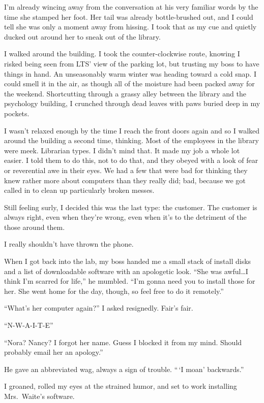 I'm already wincing away from the conversation at his very familiar words by the time she stamped her foot. Her tail was already bottle-brushed out, and I could tell she was only a moment away from hissing. I took that as my cue and quietly ducked out around her to sneak out of the library.

I walked around the building. I took the counter-clockwise route, knowing I risked being seen from LTS' view of the parking lot, but trusting my boss to have things in hand. An unseasonably warm winter was heading toward a cold snap. I could smell it in the air, as though all of the moisture had been packed away for the weekend. Shortcutting through a grassy alley between the library and the psychology building, I crunched through dead leaves with paws buried deep in my pockets.

I wasn't relaxed enough by the time I reach the front doors again and so I walked around the building a second time, thinking. Most of the employees in the library were meek. Librarian types. I didn't mind that. It made my job a whole lot easier. I told them to do this, not to do that, and they obeyed with a look of fear or reverential awe in their eyes. We had a few that were bad for thinking they knew rather more about computers than they really did; bad, because we got called in to clean up particularly broken messes.

Still feeling surly, I decided this was the last type: the customer. The customer is always right, even when they're wrong, even when it's to the detriment of the those around them.

I really shouldn't have thrown the phone.

When I got back into the lab, my boss handed me a small stack of install disks and a list of downloadable software with an apologetic look. ``She was awful\ldots{}I think I'm scarred for life,'' he mumbled. ``I'm gonna need you to install those for her. She went home for the day, though, so feel free to do it remotely.''

``What's her computer again?'' I asked resignedly. Fair's fair.

``N-W-A-I-T-E''

``Nora? Nancy? I forgot her name. Guess I blocked it from my mind. Should probably email her an apology.''

He gave an abbreviated wag, always a sign of trouble. ``\,`I moan' backwards.''

I groaned, rolled my eyes at the strained humor, and set to work installing Mrs.~Waite's software.

